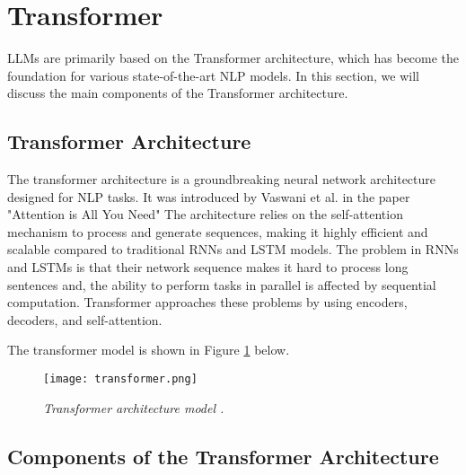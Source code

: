 \section{Transformer}

LLMs are primarily based on the Transformer architecture, which has become the foundation for various state-of-the-art NLP models. In this section, we will discuss the main components of the Transformer architecture.

\subsection{Transformer Architecture}

The transformer architecture is a groundbreaking neural network architecture designed for NLP tasks. It was introduced by Vaswani et al. in the paper "Attention is All You Need"\cite{vaswani2023attention} The architecture relies on the self-attention mechanism to process and generate sequences, making it highly efficient and scalable compared to traditional RNNs and LSTM models. The problem in RNNs and LSTMs is that their network sequence makes it hard to process long sentences and, the ability to perform tasks in parallel is affected by sequential computation. Transformer approaches these problems by using encoders, decoders, and self-attention.

\noindent The transformer model is shown in Figure \ref{fig:transformer} below.

\begin{figure}[H]
    \centering
    \texttt{[image: transformer.png]}
    \caption{
        \it{Transformer architecture model \cite{vaswani2023attention}.}
    }
    \label{fig:transformer}
\end{figure}

\subsection{Components of the Transformer Architecture}

